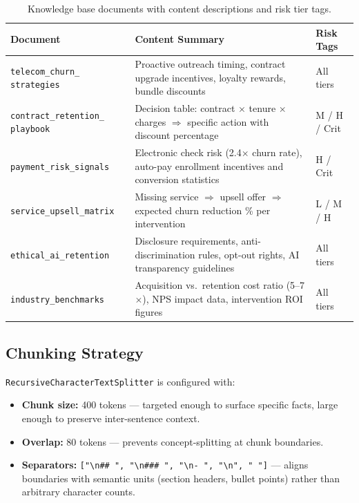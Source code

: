\documentclass[11pt]{article}
\begin{document}
\begin{table}[H]
\centering
\caption{Knowledge base documents with content descriptions and risk tier tags.}
\label{tab:kb}
\renewcommand{\arraystretch}{1.6}
\begin{tabular}{L{5cm} L{6.5cm} L{2cm}}
\toprule
{}
\textbf{Document} & \textbf{Content Summary} & \textbf{Risk Tags} \\
\midrule
\texttt{telecom\_churn\_ strategies} &
Proactive outreach timing, contract upgrade incentives,
loyalty rewards, bundle discounts &
All tiers \\
\addlinespace[3pt]
\texttt{contract\_retention\_ playbook} &
Decision table: contract $\times$ tenure $\times$ charges
$\Rightarrow$ specific action with discount percentage &
M / H / Crit \\
\addlinespace[3pt]
\texttt{payment\_risk\_signals} &
Electronic check risk (2.4$\times$ churn rate),
auto-pay enrollment incentives and conversion statistics &
H / Crit \\
\addlinespace[3pt]
\texttt{service\_upsell\_matrix} &
Missing service $\Rightarrow$ upsell offer $\Rightarrow$
expected churn reduction \% per intervention &
L / M / H \\
\addlinespace[3pt]
\texttt{ethical\_ai\_retention} &
Disclosure requirements, anti-discrimination rules,
opt-out rights, AI transparency guidelines &
All tiers \\
\addlinespace[3pt]
\texttt{industry\_benchmarks} &
Acquisition vs.\ retention cost ratio (5--7$\times$),
NPS impact data, intervention ROI figures &
All tiers \\
\bottomrule
\end{tabular}
\end{table}

\subsection{Chunking Strategy}

\texttt{RecursiveCharacterTextSplitter} is configured with:

\begin{itemize}
  \item \textbf{Chunk size:} 400 tokens --- targeted enough to surface
        specific facts, large enough to preserve inter-sentence context.
  \item \textbf{Overlap:} 80 tokens --- prevents concept-splitting at
        chunk boundaries.
  \item \textbf{Separators:}
        \texttt{["\textbackslash n\#\#\ ", "\textbackslash n\#\#\#\ ",
        "\textbackslash n-\ ", "\textbackslash n", " "]} ---
        aligns boundaries with semantic units (section headers, bullet
        points) rather than arbitrary character counts.
\end{itemize}
\end{document}
